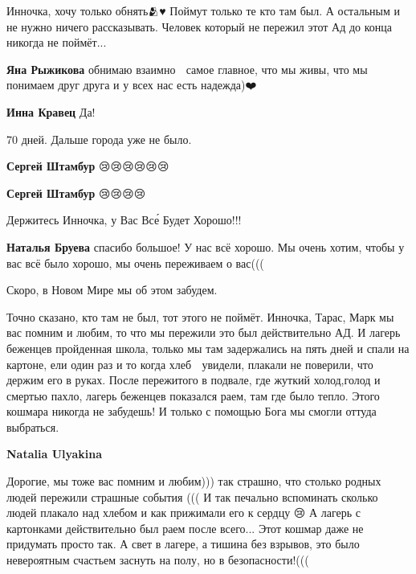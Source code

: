 
Инночка, хочу только обнять🫂♥️ Поймут только те кто там был. А остальным и не
нужно ничего рассказывать. Человек который не пережил этот Ад до конца никогда
не поймёт...

\begin{itemize} %
\textbf{Яна Рыжикова} обнимаю взаимно 🥰 самое главное, что мы живы, что мы понимаем друг друга и у всех нас есть надежда)❤️

\textbf{Инна Кравец} Да!🙏🏿

\end{itemize} %


70 дней. Дальше города уже не было.

\begin{itemize} %
\textbf{Сергей Штамбур} 😢😢😢😢😢😢

\textbf{Сергей Штамбур} 😢😢😢😢
\end{itemize} %


Держитесь Инночка, у Вас Все́ Будет Хорошо!!!

\begin{itemize} %
\textbf{Наталья Бруева} спасибо большое! У нас всё хорошо. Мы очень хотим, чтобы у вас всё было хорошо, мы очень переживаем о вас(((
\end{itemize} %


Скоро, в Новом Мире мы об этом забудем.


Точно сказано, кто там не был, тот этого не поймёт. Инночка, Тарас, Марк мы вас
помним и любим, то что мы пережили это был действительно АД. И лагерь беженцев
пройденная школа, только мы там задержались на пять дней и спали на картоне,
ели один раз и то когда хлеб 🍞 увидели, плакали не поверили, что держим его в
руках. После пережитого в подвале, где жуткий холод,голод и смертью пахло,
лагерь беженцев показался раем, там где было тепло. Этого кошмара никогда не
забудешь! И только с помощью Бога мы смогли оттуда выбраться.

\begin{itemize} %
\textbf{Natalia Ulyakina} 

Дорогие, мы тоже вас помним и любим))) так страшно, что столько родных людей
пережили страшные события ((( И так печально вспоминать сколько людей плакало
над хлебом и как прижимали его к сердцу 😢 А лагерь с картонками действительно
был раем после всего... Этот кошмар даже не придумать просто так. А свет в
лагере, а тишина без взрывов, это было невероятным счастьем заснуть на полу, но
в безопасности!(((

\end{itemize} %

